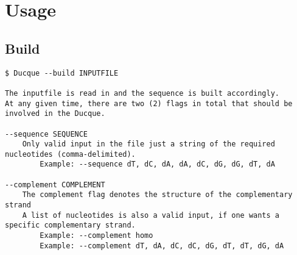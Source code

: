 \pagebreak
\section{Usage}
\subsection{Build}

\small
\begin{verbatim}
$ Ducque --build INPUTFILE

The inputfile is read in and the sequence is built accordingly.
At any given time, there are two (2) flags in total that should be involved in the Ducque.

--sequence SEQUENCE
    Only valid input in the file just a string of the required nucleotides (comma-delimited).
        Example: --sequence dT, dC, dA, dA, dC, dG, dG, dT, dA

--complement COMPLEMENT
    The complement flag denotes the structure of the complementary strand
    A list of nucleotides is also a valid input, if one wants a specific complementary strand. 
        Example: --complement homo
        Example: --complement dT, dA, dC, dC, dG, dT, dT, dG, dA
    
\end{verbatim}
\normalsize
